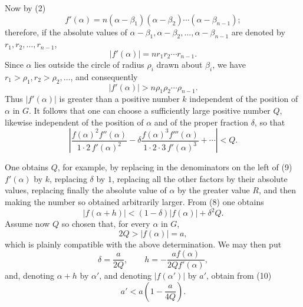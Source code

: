 \documentclass[11pt]{article}
\begin{document}
Now by (2)
\[
 f'(\alpha)=n(\alpha-\beta_1)(\alpha-\beta_2)\cdots(\alpha-\beta_{n-1});
\]
therefore, if the absolute values of $\alpha-\beta_1,\alpha-\beta_2,
\ldots,\alpha-\beta_{n-1}$ are denoted by $r_1,r_2,
\ldots,r_{n-1}$,
\[
 |f'(\alpha)|=nr_1r_2\cdots r_{n-1}.
\]
Since $\alpha$ lies outside the circle of radius $\rho_i$ drawn about $\beta_i$, we have $r_1>\rho_1,r_2>\rho_2,\ldots$, and consequently
\[
 |f'(\alpha)|>n\rho_1\rho_2\cdots\rho_{n-1}.
\]
Thus $|f'(\alpha)|$ is greater than a positive number $k$ independent of the position of $\alpha$ in $G$. It follows that one can choose a sufficiently large positive number $Q$, likewise independent of the position of $\alpha$ and of the proper fraction $\delta$, so that
\begin{equation}
 \left|\frac{f(\alpha)^2f''(\alpha)}{1\cdot2\,f'(\alpha)^2}
 -\delta\frac{f(\alpha)^3f'''(\alpha)}{1\cdot2\cdot3\,f'(\alpha)^3}+\cdots\right|<Q .
\tag{9}
\end{equation}

One obtains $Q$, for example, by replacing in the denominators on the left of (9) $f'(\alpha)$ by $k$, replacing $\delta$ by $1$, replacing all the other factors by their absolute values, replacing finally the absolute value of $\alpha$ by the greater value $R$, and then making the number so obtained arbitrarily larger. From (8) one obtains
\begin{equation}
 |f(\alpha+h)|<(1-\delta)|f(\alpha)|+\delta^2Q.
\tag{10}
\end{equation}
Assume now $Q$ so chosen that, for every $\alpha$ in $G$,
\[
 2Q>|f(\alpha)|=a,
\]
which is plainly compatible with the above determination. We may then put
\begin{equation}
 \delta=\frac{a}{2Q},\qquad
 h=-\frac{a f(\alpha)}{2Q f'(\alpha)},
\tag{11}
\end{equation}
and, denoting $\alpha+h$ by $\alpha'$, and denoting $|f(\alpha')|$ by $a'$, obtain from (10)
\begin{equation}
 a'<a\left(1-\frac{a}{4Q}\right).
\tag{12}
\end{equation}
\end{document}
